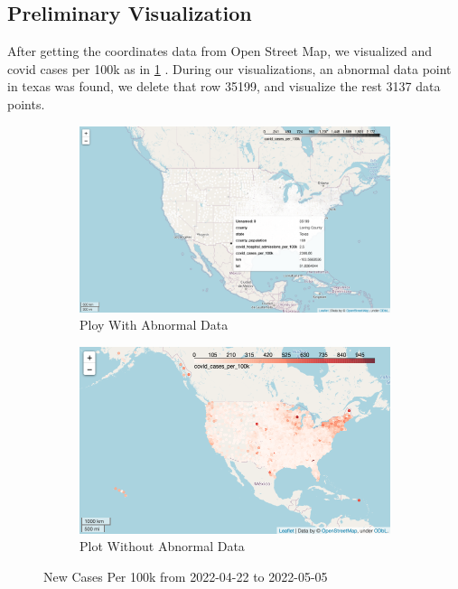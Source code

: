\documentclass{article}
\begin{document}
\subsection{Preliminary Visualization}
After getting the coordinates data from Open Street Map, we visualized
and covid cases per 100k as in \cref{New Cases Per 100k from 2022-04-22 to 2022-05-05}
. During our visualizations, an abnormal data point in texas was found, we delete that row 35199, and visualize the rest 3137 data points.
\begin{figure}[htbp]
    \centering
    \begin{subfigure}[b]{0.48\textwidth}
        \includegraphics[width=\textwidth]{fig/Suspicious Error Data in Texas.png}
        \caption{Ploy With Abnormal Data}
    \end{subfigure}
    \begin{subfigure}[b]{0.48\textwidth}
        \includegraphics[width=\textwidth]{fig/New Cases from 2022-04-22 to 2022-05-05.png}
        \caption{Plot Without Abnormal Data}
    \end{subfigure}
    \caption{New Cases Per 100k from 2022-04-22 to 2022-05-05}
    \label{New Cases Per 100k from 2022-04-22 to 2022-05-05}
\end{figure}
\end{document}
